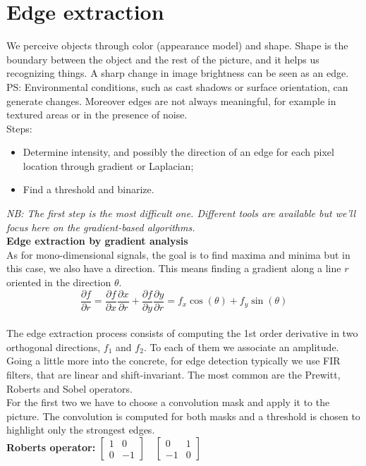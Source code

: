 \section{Edge extraction}
We perceive objects through color (appearance model) and shape. Shape is the boundary between the object and the rest of the picture, and it helps us recognizing things.
A sharp change in image brightness can be seen as an edge.
\\PS: Environmental conditions, such as cast shadows or surface orientation, can generate changes. Moreover edges are not always meaningful, for example in textured areas or in the presence of noise.
\\Steps:
\begin{itemize}
    \item Determine intensity, and possibly the direction of an edge for each pixel location through gradient or Laplacian;
    \item Find a threshold and binarize.
\end{itemize}
\textit{NB: The first step is the most difficult one. Different tools are available but we’ll focus here on the gradient-based algorithms.}
\\
\textbf{Edge extraction by gradient analysis}\\
As for mono-dimensional signals, the goal is to find maxima and minima but in this case, we also have a direction. This means finding a gradient along a line $r$ oriented in the direction $\theta$.
\[
\frac{\partial f}{\partial r} = \frac{\partial f}{\partial x}\frac{\partial x}{\partial r} + \frac{\partial f}{\partial y} \frac{\partial y}{\partial r} = f_x \cos(\theta) + f_y \sin(\theta)
\]
\\
The edge extraction process consists of computing the 1st order derivative in two orthogonal directions, $f_1$ and $f_2$. To each of them we associate an amplitude.
Going a little more into the concrete, for edge detection typically we use FIR filters, that are linear and shift-invariant. The most common are the Prewitt, Roberts and Sobel operators.
\\
For the first two we have to choose a convolution mask and apply it to the picture. The convolution is computed for both masks and a threshold is chosen to highlight only the strongest edges.
\\
\textbf{Roberts operator:} $\begin{bmatrix} 1 & 0 \\ 0 & -1 \end{bmatrix} \quad \begin{bmatrix} 0 & 1 \\ -1 & 0 \end{bmatrix}$
